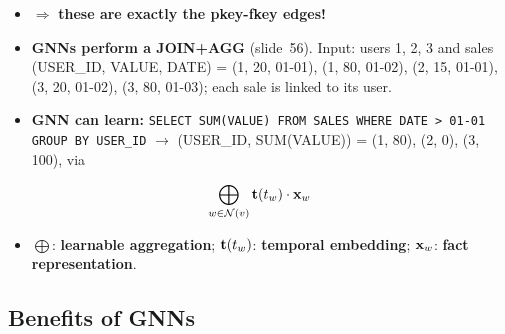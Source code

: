 \begin{itemize}
  \item[] $\Rightarrow$ \textbf{these are exactly the pkey-fkey edges!}
  \item \textbf{GNNs perform a JOIN+AGG} (slide~56). Input: users 1, 2, 3 and sales
    (USER\_ID, VALUE, DATE) = (1, 20, 01-01), (1, 80, 01-02), (2, 15, 01-01), (3, 20,
    01-02), (3, 80, 01-03); each sale is linked to its user.
  \item \textbf{GNN can learn:} \texttt{SELECT SUM(VALUE) FROM SALES WHERE DATE > 01-01
    GROUP BY USER\_ID} $\to$ (USER\_ID, SUM(VALUE)) = (1, 80), (2, 0), (3, 100), via
\end{itemize}
\begin{equation}\label{eq:lec12-joinagg}
  \bigoplus_{w\in\mathcal{N}(v)}\mathbf{t}(t_w)\cdot\mathbf{x}_w
\end{equation}
\begin{itemize}
  \item[] $\bigoplus$: \textbf{learnable aggregation}; $\mathbf{t}(t_w)$: \textbf{temporal
    embedding}; $\mathbf{x}_w$: \textbf{fact representation}.
\end{itemize}

\subsection{Benefits of GNNs}\label{sec:lec12-benefits}

